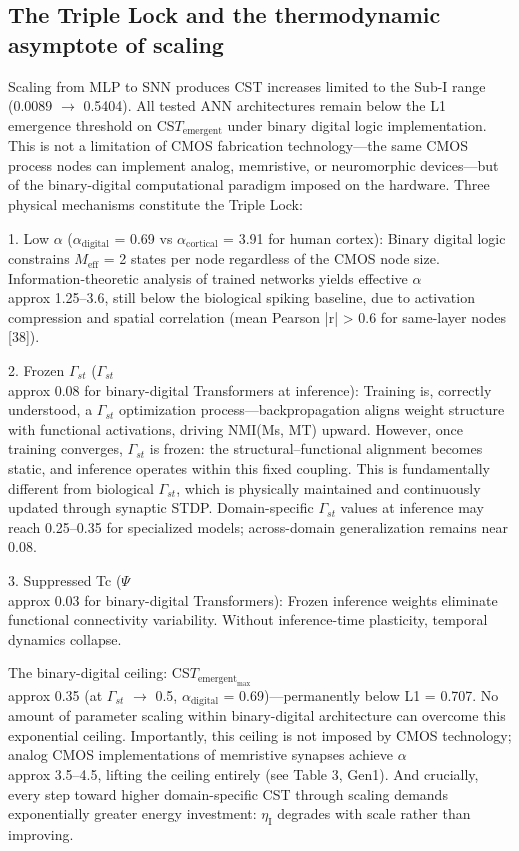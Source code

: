 \documentclass[a4paper,12pt]{article}
\begin{document}
\subsection{The Triple Lock and the thermodynamic asymptote of scaling}

Scaling from MLP to SNN produces CST increases limited to the Sub-I range (0.0089 $\rightarrow$ 0.5404). All tested ANN architectures remain below the L1 emergence threshold on CS$T_{\text{emergent}}$ under binary digital logic implementation. This is not a limitation of CMOS fabrication technology---the same CMOS process nodes can implement analog, memristive, or neuromorphic devices---but of the binary-digital computational paradigm imposed on the hardware. Three physical mechanisms constitute the Triple Lock:


1. Low $\alpha$ ($\alpha_{\text{digital}}$ = 0.69 vs $\alpha_{\text{cortical}}$ = 3.91 for human cortex): Binary digital logic constrains $M_{\text{eff}}$ = 2 states per node regardless of the CMOS node size. Information-theoretic analysis of trained networks yields effective $\alpha$  \\approx  1.25--3.6, still below the biological spiking baseline, due to activation compression and spatial correlation (mean Pearson |r| > 0.6 for same-layer nodes [38]).


2. Frozen $\Gamma_{st}$ ($\Gamma_{st}$  \\approx  0.08 for binary-digital Transformers at inference): Training is, correctly understood, a $\Gamma_{st}$ optimization process---backpropagation aligns weight structure with functional activations, driving NMI(Ms, MT) upward. However, once training converges, $\Gamma_{st}$ is frozen: the structural--functional alignment becomes static, and inference operates within this fixed coupling. This is fundamentally different from biological $\Gamma_{st}$, which is physically maintained and continuously updated through synaptic STDP. Domain-specific $\Gamma_{st}$ values at inference may reach 0.25--0.35 for specialized models; across-domain generalization remains near 0.08.


3. Suppressed Tc ($\Psi$  \\approx  0.03 for binary-digital Transformers): Frozen inference weights eliminate functional connectivity variability. Without inference-time plasticity, temporal dynamics collapse.


The binary-digital ceiling: CS$T_{\text{emergent}}_{\text{max}}$  \\approx  0.35 (at $\Gamma_{st}$ $\rightarrow$ 0.5, $\alpha_{\text{digital}}$ = 0.69)---permanently below L1 = 0.707. No amount of parameter scaling within binary-digital architecture can overcome this exponential ceiling. Importantly, this ceiling is not imposed by CMOS technology; analog CMOS implementations of memristive synapses achieve $\alpha$  \\approx  3.5--4.5, lifting the ceiling entirely (see Table 3, Gen1). And crucially, every step toward higher domain-specific CST through scaling demands exponentially greater energy investment: $\eta_{\text{I}}$ degrades with scale rather than improving.
\end{document}
